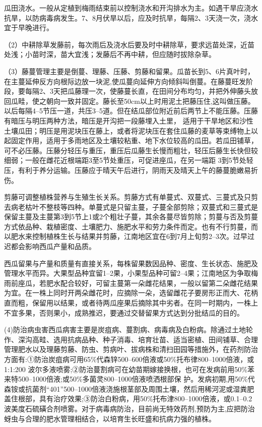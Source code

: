 \documentclass{ctexbook}
\begin{document}
瓜田浇水。一般从定植到梅雨结束前以控制浇水和开沟排水为主。如遇干旱应浇水抗旱，以防病毒病发生。7、8月伏旱以后，应及时抗旱，每隔2、3天浇一次，浇水宜于早晚进行。

（2）中耕除草发藤前，每次雨后及浇水后要及时中耕除草，要求远苗处深，近苗处浅；小苗时深，苗大宜浅；发藤后不再中耕，但应随时拔除杂草。

（3）藤蔓管理主要是倒蔓、理藤、压藤、剪藤和留果。瓜苗长到5、6片真叶时，在主蔓延伸反方向根际边放一块泥,使瓜蔓向延伸方向倾斜叫倒蔓。在藤蔓旺发阶段，要每隔2、3天把瓜藤理一次，使藤蔓长直，在田间分布均匀，并把外伸藤头放回瓜畦，使之朝向一致并固定。藤长至50cm以上时用泥土把藤压住,这叫做压藤。以后每隔4--5节压一道，共压3--5道。但在结瓜部位附近前后两节上不能压藤。压藤有暗压与明压两种方法，暗压是开沟把一段藤埋入土里，
适用于干旱地区和沙性土壤瓜田；明压是用泥块压在藤上，或者将泥块压在套住瓜藤的麦草等束缚物上以起固定作用，适用于多雨地区及土壤较粘重、地下水位较高的瓜田。若瓜田铺草，可不必压藤。压藤分轻压与重压，重压后瓜藤生长慢而粗壮，轻压后藤生长快但较细弱；一般在雌花近根端距3至5节处重压，可促进座瓜，在另一端距
3到5节处轻压，有利于养分运输。压藤应于晴天午后进行，阴雨天及晴天上午的藤蔓脆嫩易折伤。

剪藤可调整植株营养与生殖生长关系。剪藤方式有单蔓式、双蔓式、三蔓式及只剪去病老枯叶不整枝等四种。单蔓式是只留主蔓，子蔓全部剪除；双蔓式和三蔓式是保留主蔓及主蔓第3到5节上1或2个粗壮子蔓，其余各蔓尽皆剪除；剪蔓与否及剪蔓方式依品种、栽植密度、土壤肥力、施肥水平和劳力条件而定。也有不行剪蔓，而以肥水来控制植株生长与结果并剪藤，江南地区宜在6到7月上旬剪2--3次。过早过迟都会影响西瓜产量和品质。

西瓜留果与产量和质量有直接关系，每株留果数因品种、密度、生长状态、施肥及管理水平而异。大果型品种宜留1--2果，小果型品种可留2--4果；江南地区为争取梅雨前座瓜，若肥水配合较好，可留主蔓第一朵雌花结果，一般以留第二朵雌花结果为宜。在一株上同时开两朵雌花时，应摘除一朵，选留雌花子要房形正而大、花柄直而粗，保留用以结果，或者待两瓜座果后摘除其中劣者。在同一时期内，一株上不宜多果，否则果小，成熟推迟，要通过交替留果方式达到分批结瓜的目的。

(4)防治病虫害西瓜病害主要是炭疽病、蔓割病、病毒病及白粉病。除通过土地轮作、深沟高畦、选用抗病品种、种子消毒、培育壮苗、适当密植、田间铺草、合理管理肥水以及理藤剪藤、防虫、剪病叶、拔病株和清扫田园等措施外，在药剂防治方面有:①防治炭疽病可用65\%代森锌500--600倍液或50\%托布律800--1000倍液，或1:1:200
波尔多液喷雾;②防治蔓割病可在幼苗期嫁接换根，也可在发病前用50\%苯来特500--1000倍液;或50\%多菌灵800--1000倍液喷洒根部保
护。发病初期,用50\%代森铵或抗菌剂“401”500--1000倍液浇施根茎部及周围土壤，然后用稀河泥或湿粪肥盖住根部，具有治疗效果;③防治白粉病，用50\%托布津800--1000倍液，或0.1--0.2波美度石硫磺合剂喷雾。对于病毒病防治，目前尚无特效药剂,预防为主,应把防治蚜虫与合理的肥水管理相结合，以培育生长旺盛和抗病力强的植株。
\end{document}
